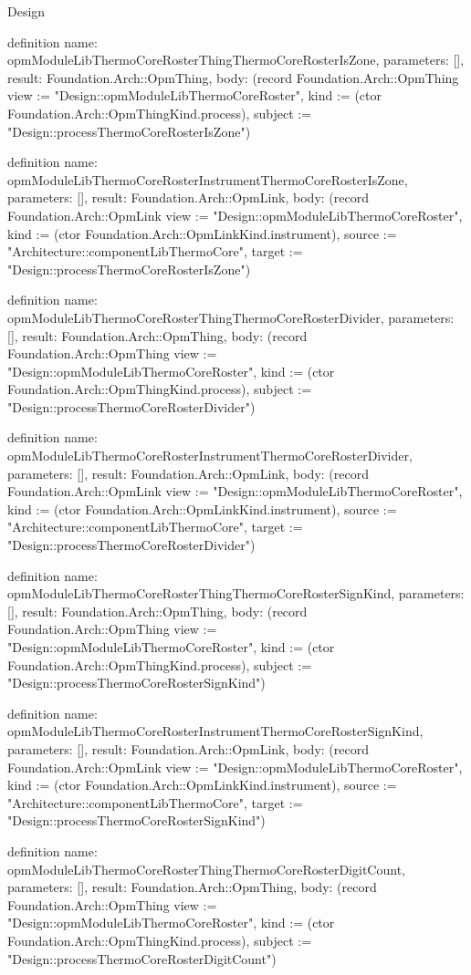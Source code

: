 \begin{lexlean}{Design}
\begin{semanticmodule}
definition{
  name: opmModuleLibThermoCoreRosterThingThermoCoreRosterIsZone,
  parameters: [],
  result: Foundation.Arch::OpmThing,
  body: (record Foundation.Arch::OpmThing {view := "Design::opmModuleLibThermoCoreRoster", kind := (ctor Foundation.Arch::OpmThingKind.process), subject := "Design::processThermoCoreRosterIsZone"})
}

definition{
  name: opmModuleLibThermoCoreRosterInstrumentThermoCoreRosterIsZone,
  parameters: [],
  result: Foundation.Arch::OpmLink,
  body: (record Foundation.Arch::OpmLink {view := "Design::opmModuleLibThermoCoreRoster", kind := (ctor Foundation.Arch::OpmLinkKind.instrument), source := "Architecture::componentLibThermoCore", target := "Design::processThermoCoreRosterIsZone"})
}

definition{
  name: opmModuleLibThermoCoreRosterThingThermoCoreRosterDivider,
  parameters: [],
  result: Foundation.Arch::OpmThing,
  body: (record Foundation.Arch::OpmThing {view := "Design::opmModuleLibThermoCoreRoster", kind := (ctor Foundation.Arch::OpmThingKind.process), subject := "Design::processThermoCoreRosterDivider"})
}

definition{
  name: opmModuleLibThermoCoreRosterInstrumentThermoCoreRosterDivider,
  parameters: [],
  result: Foundation.Arch::OpmLink,
  body: (record Foundation.Arch::OpmLink {view := "Design::opmModuleLibThermoCoreRoster", kind := (ctor Foundation.Arch::OpmLinkKind.instrument), source := "Architecture::componentLibThermoCore", target := "Design::processThermoCoreRosterDivider"})
}

definition{
  name: opmModuleLibThermoCoreRosterThingThermoCoreRosterSignKind,
  parameters: [],
  result: Foundation.Arch::OpmThing,
  body: (record Foundation.Arch::OpmThing {view := "Design::opmModuleLibThermoCoreRoster", kind := (ctor Foundation.Arch::OpmThingKind.process), subject := "Design::processThermoCoreRosterSignKind"})
}

definition{
  name: opmModuleLibThermoCoreRosterInstrumentThermoCoreRosterSignKind,
  parameters: [],
  result: Foundation.Arch::OpmLink,
  body: (record Foundation.Arch::OpmLink {view := "Design::opmModuleLibThermoCoreRoster", kind := (ctor Foundation.Arch::OpmLinkKind.instrument), source := "Architecture::componentLibThermoCore", target := "Design::processThermoCoreRosterSignKind"})
}

definition{
  name: opmModuleLibThermoCoreRosterThingThermoCoreRosterDigitCount,
  parameters: [],
  result: Foundation.Arch::OpmThing,
  body: (record Foundation.Arch::OpmThing {view := "Design::opmModuleLibThermoCoreRoster", kind := (ctor Foundation.Arch::OpmThingKind.process), subject := "Design::processThermoCoreRosterDigitCount"})
}


\end{semanticmodule}
\end{lexlean}
